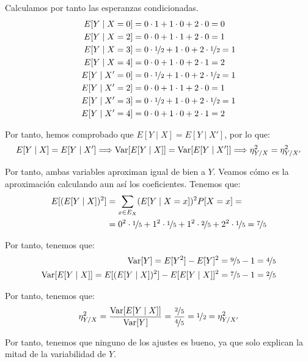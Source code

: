 \begin{ejercicio}
    Calculamos por tanto las esperanzas condicionadas.
    \begin{align*}
        E[Y\mid X = 0] &= 0\cdot 1 + 1\cdot 0 + 2\cdot 0 = 0\\
        E[Y\mid X = 2] &= 0\cdot 0 + 1\cdot 1 + 2\cdot 0 = 1\\
        E[Y\mid X = 3] &= 0\cdot \nicefrac{1}{2} + 1\cdot 0 + 2\cdot \nicefrac{1}{2} = 1\\
        E[Y\mid X = 4] &= 0\cdot 0 + 1\cdot 0 + 2\cdot 1 = 2\\
        E[Y\mid X' = 0] &= 0\cdot \nicefrac{1}{2} + 1\cdot 0 + 2\cdot \nicefrac{1}{2} = 1\\
        E[Y\mid X' = 2] &= 0\cdot 0 + 1\cdot 1 + 2\cdot 0 = 1\\
        E[Y\mid X' = 3] &= 0\cdot \nicefrac{1}{2} + 1\cdot 0 + 2\cdot \nicefrac{1}{2} = 1\\
        E[Y\mid X' = 4] &= 0\cdot 0 + 1\cdot 0 + 2\cdot 1 = 2
    \end{align*}

    Por tanto, hemos comprobado que $E[Y\mid X] = E[Y\mid X']$, por lo que:
    \begin{equation*}
        E[Y\mid X]=E[Y\mid X'] \Longrightarrow
        \operatorname{Var}[E[Y\mid X]] = \operatorname{Var}[E[Y\mid X']]
        \Longrightarrow \eta^2_{Y/X} = \eta^2_{Y/X'}
    \end{equation*}

    Por tanto, ambas variables aproximan igual de bien a $Y$. Veamos cómo es la aproximación calculando aun así los coeficientes. Tenemos que:
    \begin{align*}
        E[(E[Y\mid X])^2] &= \sum_{x\in E_X} (E[Y\mid X = x])^2 P[X = x]
        =\\&= 0^2\cdot \nicefrac{1}{5} + 1^2\cdot \nicefrac{1}{5} + 1^2\cdot \nicefrac{2}{5} + 2^2\cdot \nicefrac{1}{5} = \nicefrac{7}{5}
    \end{align*}

    Por tanto, tenemos que:
    \begin{align*}
        \operatorname{Var}[Y] = E[Y^2] - E[Y]^2 = \nicefrac{9}{5} - 1 = \nicefrac{4}{5}\\
        \operatorname{Var}[E[Y\mid X]] = E[(E[Y\mid X])^2] - E[E[Y\mid X]]^2 = \nicefrac{7}{5} - 1 = \nicefrac{2}{5}
    \end{align*}

    Por tanto, tenemos que:
    \begin{equation*}
        \eta^2_{Y/X} = \dfrac{\operatorname{Var}[E[Y\mid X]]}{\operatorname{Var}[Y]} = \dfrac{\nicefrac{2}{5}}{\nicefrac{4}{5}} = \nicefrac{1}{2} = \eta^2_{Y/X'}
    \end{equation*}

    Por tanto, tenemos que ninguno de los ajustes es bueno, ya que solo explican la mitad de la variabilidad de $Y$.
\end{ejercicio}

